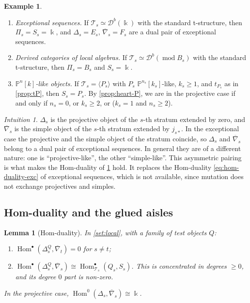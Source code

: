 \documentclass[11pt,reqno]{amsart}
\theoremstyle{plain}
\newtheorem{lemma}[theorem]{Lemma}
\theoremstyle{definition}
\newtheorem{example}[theorem]{Example}
\theoremstyle{remark}
\newtheorem*{intuition}{Intuition}
\newcommand{\kk}{\Bbbk}
\DeclareMathOperator{\Hom}{Hom}
\newcommand{\modd}{\operatorname{mod}}
\newcommand{\Db}{\mathcal{D}^b}
\newcommand{\thick}[1]{\langle #1\rangle}
\newcommand{\Pn}[2]{\mathbb{P}^{#1}[#2]}
\newcommand{\nablabar}{\overline{\nabla}}
\newcommand{\cT}{\mathcal{T}}
\begin{document}
\begin{example}\label{ex:local-settings}
\leavevmode
\begin{enumerate}
\item \emph{Exceptional sequences.} If $\cT_s\simeq\Db(\kk)$ with the standard t-structure, then $\Pi_s=S_s=\kk$, and $\Delta_s=E_s$, $\nablabar_s=F_s$ are a dual pair of exceptional sequences.
\item \emph{Derived categories of local algebras.} If $\cT_s\simeq\Db(\modd B_s)$ with the standard t-structure, then $\Pi_s=B_s$ and $S_s=\kk$.
\item \emph{$\Pn nk$-like objects.} If $\cT_s=\thick{P_s}$ with $P_s$ $\Pn{n_s}{k_s}$-like, $k_s\ge1$, and $t_{P_s}$ as in \cref{prop:tP}, then $S_s=P_s$. By \cref{prop:heart-P}, we are in the projective case if and only if $n_s=0$, or $k_s\ge2$, or ($k_s=1$ and $n_s\ge2$).
\end{enumerate}
\end{example}

\begin{intuition}
$\Delta_s$ is the projective object of the $s$-th stratum extended by zero, and $\nablabar_s$ is the simple object of the $s$-th stratum extended by $j_{s*}$. In the exceptional case the projective and the simple object of the stratum coincide, so $\Delta_s$ and $\nablabar_s$ belong to a dual pair of exceptional sequences. In general they are of a different nature: one is ``projective-like'', the other ``simple-like''. This asymmetric pairing is what makes the Hom-duality of \cref{lem:hom-duality} hold. It replaces the Hom-duality \eqref{eq:hom-duality-exc} of exceptional sequences, which is not available, since mutation does not exchange projectives and simples.
\end{intuition}

\subsection{Hom-duality and the glued aisles}

\begin{lemma}[Hom-duality]\label{lem:hom-duality}
In \cref{set:local}, with a family of test objects $Q$:
\begin{enumerate}
\item $\Hom^\bullet(\Delta^Q_s,\nablabar_t)=0$ for $s\ne t$;
\item $\Hom^\bullet(\Delta^Q_s,\nablabar_s)\cong\Hom^\bullet_{\cT_s}(Q_s,S_s)$. This is concentrated in degrees $\ge0$, and its degree $0$ part is non-zero.
\end{enumerate}
In the projective case, $\Hom^0(\Delta_s,\nablabar_s)\cong\kk$.
\end{lemma}
\end{document}
